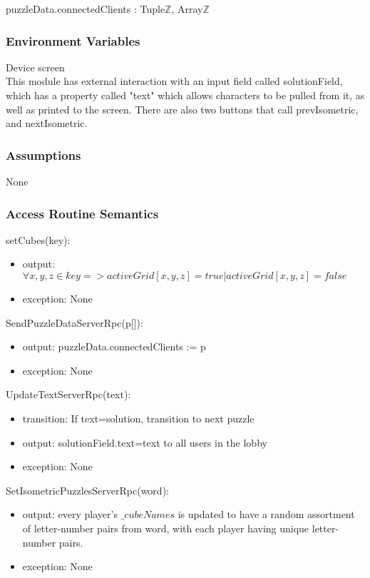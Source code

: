 \documentclass[12pt, titlepage]{article}
\begin{document}
puzzleData.connectedClients : Tuple\textlangle$\mathds{Z}$, Array\textlangle$\mathds{Z}$\textrangle\textrangle

\subsubsection{Environment Variables}

Device screen\\
This module has external interaction with an input field called solutionField, which has a property called "text" which allows characters to be pulled from it, as well as printed to the screen. There are also two buttons that call prevIsometric, and nextIsometric.

\subsubsection{Assumptions}

None

\subsubsection{Access Routine Semantics}

\noindent setCubes(key):
\begin{itemize}
\item output: $\forall x,y,z \in key => activeGrid[x,y,z]=true|activeGrid[x,y,z]=false$
\item exception: None
\end{itemize}

\noindent SendPuzzleDataServerRpc(p[]):
\begin{itemize}
\item output: puzzleData.connectedClients := p
\item exception: None
\end{itemize}

\noindent UpdateTextServerRpc(text):
\begin{itemize}
\item transition: If text=solution, transition to next puzzle
\item output: solutionField.text=text to all users in the lobby
\item exception: None
\end{itemize}

\noindent SetIsometricPuzzlesServerRpc(word):
\begin{itemize}
\item output: every player's $\_cubeNames$ is updated to have a random assortment of letter-number pairs from word, with each player having unique letter-number pairs. 
\item exception: None
\end{itemize}
\end{document}
